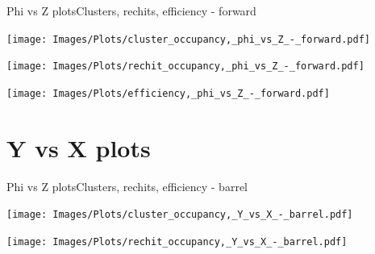 \documentclass{beamer}
\begin{document}
\begin{frame}{Phi vs Z plots}{Clusters, rechits, efficiency - forward}
  \hspace{0.01\textwidth}%
  \begin{minipage}{0.32\textwidth}
    \centering
    \texttt{[image: Images/Plots/cluster\_occupancy,\_phi\_vs\_Z\_-\_forward.pdf]}
  \end{minipage}%
  \hspace{0.01\textwidth}%
  \begin{minipage}{0.32\textwidth}
    \centering
    \texttt{[image: Images/Plots/rechit\_occupancy,\_phi\_vs\_Z\_-\_forward.pdf]}
  \end{minipage}
  \vspace*{0.2cm}
  \begin{minipage}{0.32\textwidth}
    \centering
    \texttt{[image: Images/Plots/efficiency,\_phi\_vs\_Z\_-\_forward.pdf]}
  \end{minipage}%
\end{frame}

\section{Y vs X plots}

\begin{frame}{Phi vs Z plots}{Clusters, rechits, efficiency - barrel}
  \hspace{0.01\textwidth}%
  \begin{minipage}{0.48\textwidth}
    \centering
    \texttt{[image: Images/Plots/cluster\_occupancy,\_Y\_vs\_X\_-\_barrel.pdf]}
  \end{minipage}%
  \hspace{0.01\textwidth}%
  \begin{minipage}{0.48\textwidth}
    \centering
    \texttt{[image: Images/Plots/rechit\_occupancy,\_Y\_vs\_X\_-\_barrel.pdf]}
  \end{minipage}
\end{frame}
\end{document}
